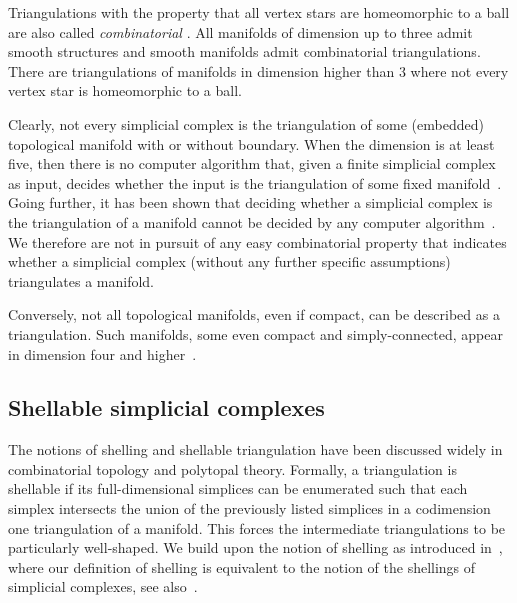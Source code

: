 \documentclass[10pt,letterpaper]{article}
\begin{document}
\begin{remark}
    Triangulations with the property that all vertex stars are homeomorphic to a ball are also called \emph{combinatorial} \cite[Section~1]{Bagchi2005}.
    All manifolds of dimension up to three admit smooth structures and smooth manifolds admit combinatorial triangulations. 
    There are triangulations of manifolds in dimension higher than $3$ where not every vertex star is homeomorphic to a ball. 
    
    Clearly, not every simplicial complex is the triangulation of some (embedded) topological manifold with or without boundary. 
    When the dimension is at least five, then there is no computer algorithm that, given a finite simplicial complex as input, decides whether the input is the triangulation of some fixed manifold~\cite{chernavsky2006unrecognizability}.
    Going further, it has been shown that deciding whether a simplicial complex is the triangulation of a manifold cannot be decided by any computer algorithm~\cite{poonen2014undecidable}.     
    We therefore are not in pursuit of any easy combinatorial property that indicates whether a simplicial complex (without any further specific assumptions) triangulates a manifold.

    Conversely, not all topological manifolds, even if compact, can be described as a triangulation. 
    Such manifolds, some even compact and simply-connected, appear in dimension four and higher~\cite{akbulut2014casson}.
\end{remark}








\subsection{Shellable simplicial complexes}\label{subsection:shellability}


The notions of shelling and shellable triangulation have been discussed widely in combinatorial topology and polytopal theory. 
Formally, a triangulation is shellable if its full-dimensional simplices can be enumerated such that each simplex intersects the union of the previously listed simplices in a codimension one triangulation of a manifold. 
This forces the intermediate triangulations to be particularly well-shaped. 
We build upon the notion of shelling as introduced in~\cite[Definition 8.1]{ziegler1995lectures},
where our definition of shelling is equivalent to the notion of the shellings of simplicial complexes, see also~\cite[Remark~8.3]{ziegler1995lectures}. 
\end{document}
